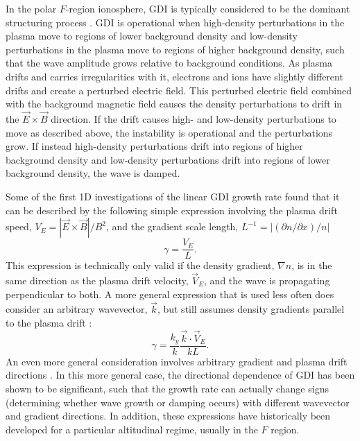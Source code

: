In the polar \(F\)-region ionosphere, GDI is typically considered to be the dominant structuring process \citep{Weber1984,Cerisier1985,Basu1988,Tsunoda1988,Fukumoto2000}.  GDI is operational when high-density perturbations in the plasma move to regions of lower background density and low-density perturbations in the plasma move to regions of higher background density, such that the wave amplitude grows relative to background conditions.  As plasma drifts and carries irregularities with it, electrons and ions have slightly different drifts and create a perturbed electric field.  This perturbed electric field combined with the background magnetic field causes the density perturbations to drift in the \(\vec{E}\times\vec{B}\) direction.  If the drift causes high- and low-density perturbations to move as described above, the instability is operational and the perturbations grow.  If instead high-density perturbations drift into regions of higher background density and low-density perturbations drift into regions of lower background density, the wave is damped.

Some of the first 1D investigations of the linear GDI growth rate found that it can be described by the following simple expression involving the plasma drift speed, \(V_E = |\vec{E}\times\vec{B}|/B^2\), and the gradient scale length, \(L^{-1} = |(\partial n/\partial x)/n|\) \citep{Simon1963,Hoh1963,Linson1970}
\begin{equation}
	\label{eqn:gdi_old}
	\gamma = \frac{V_E}{L}.
\end{equation}
This expression is technically only valid if the density gradient, \(\nabla n\), is in the same direction as the plasma drift velocity, \(\vec{V}_E\), and the wave is propagating perpendicular to both.  A more general expression that is used less often does consider an arbitrary wavevector, \(\vec{k}\), but still assumes density gradients parallel to the plasma drift \citep{Tsunoda1988}:
\begin{equation}
	\label{eqn:gdi_80s}
	\gamma = \frac{k_y}{k}\frac{\vec{k}\cdot\vec{V}_E}{kL}.
\end{equation}
An even more general consideration involves arbitrary gradient and plasma drift directions \citep{Keskinen1982,Makarevich2014c}.  In this more general case, the directional dependence of GDI has been shown to be significant, such that the growth rate can actually 
change signs (determining whether wave growth or damping occurs) with different wavevector and gradient directions.  In addition, these expressions have historically been developed for a particular altitudinal regime, usually in the \(F\) region.

